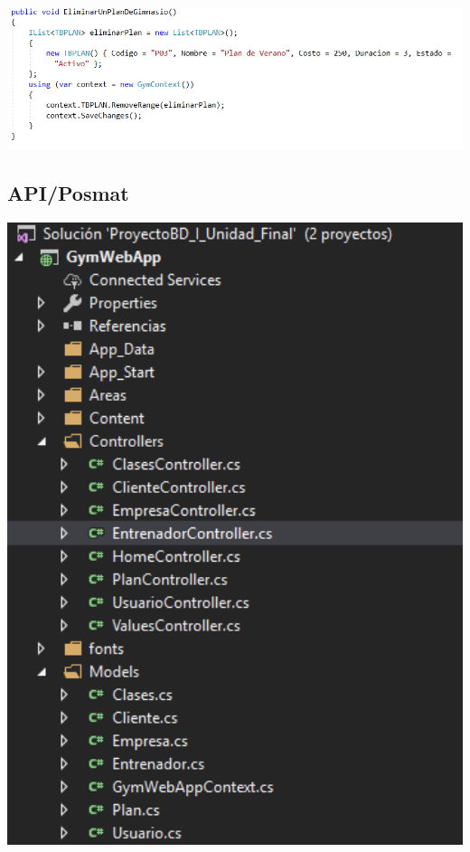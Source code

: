 \begin{center}
\includegraphics[width=15cm]{./Imagenes/prueba5.png}
\end{center}

\subsection{API/Posmat}

             \begin{center}
			\includegraphics[width=15cm]{./Imagenes/1}
             \end{center}

